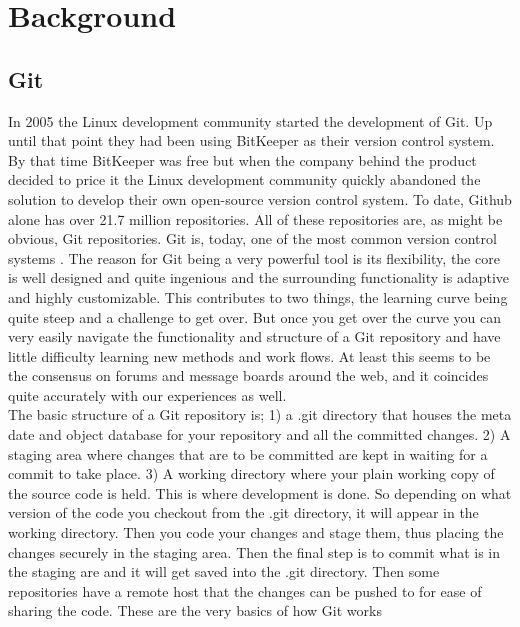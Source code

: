 \documentclass[a4paper,oneside]{bth} %
\begin{document}
		\chapter{Background}
			\section{Git}
			In 2005 the Linux development community started the development of Git.
			Up until that point they had been using BitKeeper as their version control system. By that time BitKeeper was free but when the company behind the product decided to price it the Linux development community quickly abandoned the solution to develop their own open-source version control system.\cite{ProGit}
			To date, Github alone has over 21.7 million repositories.\cite{GithubAbout} All of these repositories are, as might be obvious, Git repositories. 
			Git is, today, one of the most common version control systems \cite{EclipseDeveoperReport}\cite{DeveloperProductivity}\cite{MicrosoftSurveyResults}. The reason for Git being a very powerful tool is its flexibility, the core is well designed and quite ingenious and the surrounding functionality is adaptive and highly customizable. This contributes to two things, the learning curve being quite steep and a challenge to get over. But once you get over the curve you can very easily navigate the functionality and structure of a Git repository and have little difficulty learning new methods and work flows. At least this seems to be the consensus on forums and message boards around the web, and it coincides quite accurately with our experiences as well.
			\\
			The basic structure of a Git repository is; 1) a .git directory that houses the meta date and object database for your repository and all the committed changes. 2) A staging area where changes that are to be committed are kept in waiting for a commit to take place. 3) A working directory where your plain working copy of the source code is held. This is where development is done. \cite{GitStructure} 
			So depending on what version of the code you checkout from the .git directory, it will appear in the working directory. Then you code your changes and stage them, thus placing the changes securely in the staging area. Then the final step is to commit what is in the staging are and it will get saved into the .git directory. Then some repositories have a remote host that the changes can be pushed to for ease of sharing the code. These are the very basics of how Git works \cite{GitStructure}
			
\end{document}
